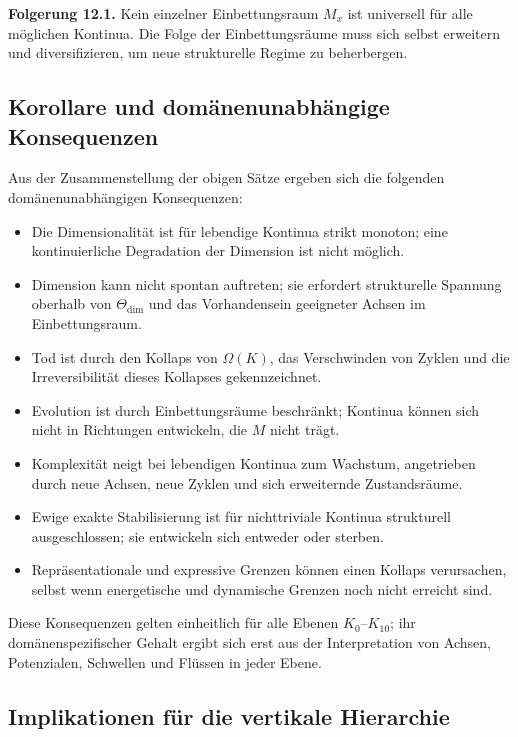 \textbf{Folgerung 12.1.}
Kein einzelner Einbettungsraum \(M_x\) ist universell für alle möglichen Kontinua.
Die Folge der Einbettungsräume muss sich selbst erweitern und diversifizieren, um neue strukturelle Regime zu beherbergen.

\subsection{Korollare und domänenunabhängige Konsequenzen}

Aus der Zusammenstellung der obigen Sätze ergeben sich die folgenden domänenunabhängigen Konsequenzen:

\begin{itemize}
    \item Die Dimensionalität ist für lebendige Kontinua strikt monoton; eine kontinuierliche Degradation der Dimension ist nicht möglich.
    \item Dimension kann nicht spontan auftreten; sie erfordert strukturelle Spannung oberhalb von \(\Theta_{\mathrm{dim}}\) und das Vorhandensein geeigneter Achsen im Einbettungsraum.
    \item Tod ist durch den Kollaps von \(\Omega(K)\), das Verschwinden von Zyklen und die Irreversibilität dieses Kollapses gekennzeichnet.
    \item Evolution ist durch Einbettungsräume beschränkt; Kontinua können sich nicht in Richtungen entwickeln, die \(M\) nicht trägt.
    \item Komplexität neigt bei lebendigen Kontinua zum Wachstum, angetrieben durch neue Achsen, neue Zyklen und sich erweiternde Zustandsräume.
    \item Ewige exakte Stabilisierung ist für nichttriviale Kontinua strukturell ausgeschlossen; sie entwickeln sich entweder oder sterben.
    \item Repräsentationale und expressive Grenzen können einen Kollaps verursachen, selbst wenn energetische und dynamische Grenzen noch nicht erreicht sind.
\end{itemize}

Diese Konsequenzen gelten einheitlich für alle Ebenen \(K_0\)–\(K_{10}\); ihr domänenspezifischer Gehalt ergibt sich erst aus der Interpretation von Achsen, Potenzialen, Schwellen und Flüssen in jeder Ebene.

\subsection{Implikationen für die vertikale Hierarchie}

